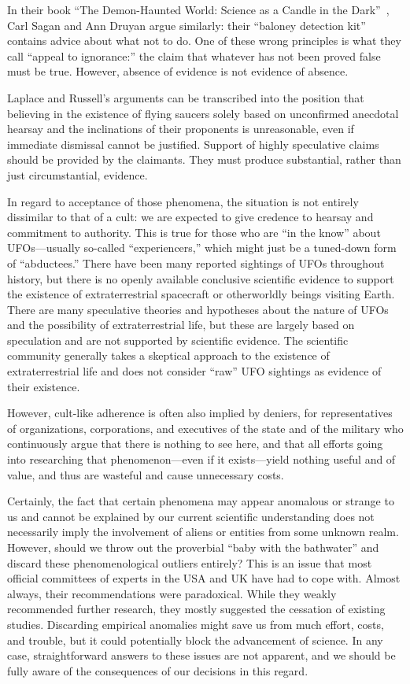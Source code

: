 In their book ``The Demon-Haunted World: Science as a Candle in the Dark''~\cite{Sagan1997Feb},  Carl Sagan  and Ann Druyan
argue similarly: their ``baloney detection kit'' contains advice about what not to do. One of these wrong principles is
what they call ``appeal to ignorance:'' the claim that whatever has not been proved false must be true.
However, absence of evidence is not evidence of absence.

Laplace and Russell's arguments can be transcribed into the position that
believing in the existence of flying saucers solely based on unconfirmed anecdotal hearsay and the inclinations
of their proponents is unreasonable, even if immediate dismissal cannot be justified.
Support of highly speculative claims should be provided by the claimants.
They must produce substantial, rather than just circumstantial, evidence.


In regard to acceptance of those phenomena, the situation is not entirely dissimilar to that of a cult:
we are expected to give credence to hearsay and commitment to authority.
This is true for those who are ``in the know'' about UFOs---usually so-called ``experiencers,'' which might just be a tuned-down form of ``abductees.''
There have been many reported sightings of UFOs throughout history,
but there is no openly available conclusive scientific evidence
to support the existence of extraterrestrial spacecraft or otherworldly beings visiting Earth.
There are many speculative theories and hypotheses about the nature of UFOs and the possibility of extraterrestrial life,
but these are largely based on speculation and are not supported by scientific evidence.
The scientific community generally takes a skeptical approach to the existence of extraterrestrial life and does not consider
``raw'' UFO sightings as evidence of their existence.

However, cult-like adherence is often also implied by deniers,
for representatives of organizations, corporations, and executives of the state and of the military who continuously argue
that there is nothing to see here, and that all efforts going into researching that phenomenon---even if it exists---yield nothing useful and of value,
and thus are wasteful and cause unnecessary costs.


Certainly, the fact that certain phenomena may appear anomalous or strange to us and cannot be explained
by our current scientific understanding does not necessarily imply the involvement of aliens or entities from some unknown realm.
However, should we throw out the proverbial ``baby with the bathwater'' and discard these phenomenological outliers entirely?
This is an issue that most official committees of experts in the USA and UK have had to cope with.
Almost always, their recommendations were paradoxical.
While they weakly recommended further research, they mostly suggested the cessation of existing studies.
Discarding empirical anomalies might save us from much effort, costs, and trouble, but it could potentially block the advancement of science. In any case, straightforward answers to these issues are not apparent,
and we should be fully aware of the consequences of our decisions in this regard.



